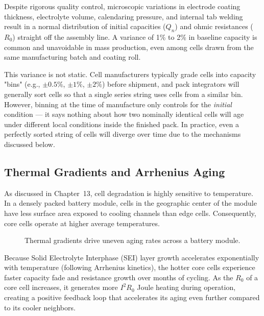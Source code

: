 Despite rigorous quality control, microscopic variations in electrode coating thickness, electrolyte volume, calendaring pressure, and internal tab welding result in a normal distribution of initial capacities ($Q_n$) and ohmic resistances ($R_0$) straight off the assembly line. A variance of 1\% to 2\% in baseline capacity is common and unavoidable in mass production, even among cells drawn from the same manufacturing batch and coating roll.

This variance is not static. Cell manufacturers typically grade cells into capacity "bins" (e.g., $\pm 0.5\%$, $\pm 1\%$, $\pm 2\%$) before shipment, and pack integrators will generally sort cells so that a single series string uses cells from a similar bin. However, binning at the time of manufacture only controls for the \emph{initial} condition — it says nothing about how two nominally identical cells will age under different local conditions inside the finished pack. In practice, even a perfectly sorted string of cells will diverge over time due to the mechanisms discussed below.

\subsection{Thermal Gradients and Arrhenius Aging}
\label{subsec:14_thermal}

As discussed in Chapter~13, cell degradation is highly sensitive to temperature. In a densely packed battery module, cells in the geographic center of the module have less surface area exposed to cooling channels than edge cells. Consequently, core cells operate at higher average temperatures.

\begin{figure}[htbp]
\centering
{}
\caption{Thermal gradients drive uneven aging rates across a battery module.}
\label{fig:14_thermal_gradient}
\end{figure}

Because Solid Electrolyte Interphase (SEI) layer growth accelerates exponentially with temperature (following Arrhenius kinetics), the hotter core cells experience faster capacity fade and resistance growth over months of cycling. As the $R_0$ of a core cell increases, it generates more $I^2 R_0$ Joule heating during operation, creating a positive feedback loop that accelerates its aging even further compared to its cooler neighbors.

